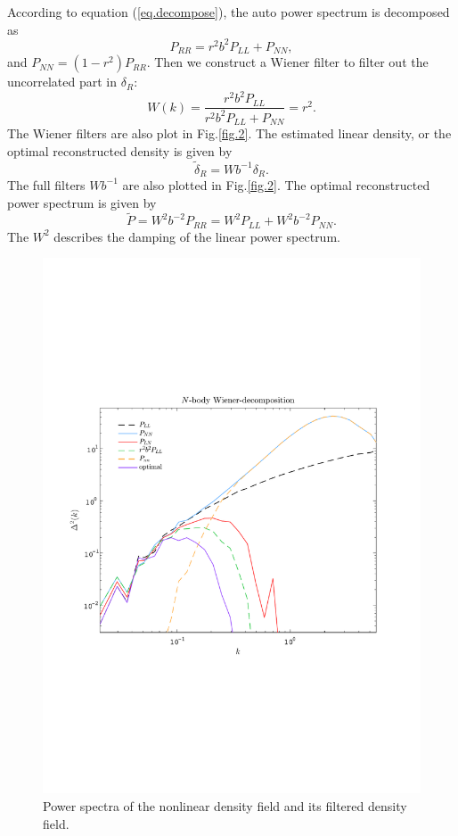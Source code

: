 \documentclass[aps,prd,twocolumn,superscriptaddress,amsfont,amssymb,amsmath,nofootinbib,showpacs,balancelastpage]{revtex4-1}
\begin{document}
According to equation (\ref{eq.decompose}), the auto power spectrum is decomposed as
\begin{equation}
    P_{RR}=r^2b^2P_{LL}+P_{NN},
\end{equation}
and $P_{NN}=(1-r^2)P_{RR}$. Then we construct a Wiener filter to filter out the uncorrelated part in $\delta_R$:
\begin{equation}
    W(k)=\frac{r^2b^2P_{LL}}{r^2b^2P_{LL}+P_{NN}}=r^2.
\end{equation}
The Wiener filters are also plot in Fig.\ref{fig.2}. The estimated linear density, or the optimal reconstructed density is given by
\begin{equation}
    \tilde\delta_R=Wb^{-1}\delta_R.
\end{equation}
The full filters $Wb^{-1}$ are also plotted in Fig.\ref{fig.2}. The optimal reconstructed power spectrum is given by
\begin{equation}
    \tilde P=W^2b^{-2}P_{RR}=W^2P_{LL}+W^2b^{-2}P_{NN}.
\end{equation}
The $W^2$ describes the damping of the linear power spectrum.







\begin{figure}[t] \centering
  \includegraphics[width=1.0\linewidth]{fig3.pdf}
  \caption{Power spectra of the nonlinear density field and its
  filtered density field.}
  \label{fig.3}
\end{figure}
\end{document}

